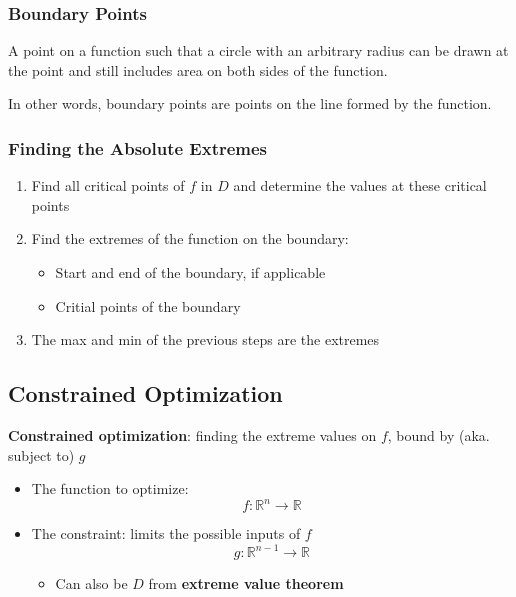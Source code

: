       \subsubsection{Boundary Points}

        A point on a function such that a circle with an arbitrary radius
        can be drawn at the point and still includes area on both sides of the
        function.

        In other words, boundary points are points on the line formed by the
        function.

      \subsubsection{Finding the Absolute Extremes}

        \begin{enumerate}
          \item Find all critical points of $ f $ in $ D $ and determine
          the values at these critical points
          \item Find the extremes of the function on the boundary:
          \begin{itemize}
            \item Start and end of the boundary, if applicable
            \item Critial points of the boundary
          \end{itemize}

          \item The max and min of the previous steps are the extremes
        \end{enumerate}

  \subsection{Constrained Optimization}

    \textbf{Constrained optimization}: finding the extreme values on $ f $,
    bound by (aka. subject to) $ g $

    \begin{itemize}
      \item The function to optimize:
      \begin{displaymath}
        f: \mathbb{R}^{n} \to \mathbb{R}
      \end{displaymath}

      \item The constraint: limits the possible inputs of $ f $
      \begin{displaymath}
        g: \mathbb{R}^{n - 1} \to \mathbb{R}
      \end{displaymath}
      \begin{itemize}
        \item Can also be $ D $ from \textbf{extreme value theorem}
      \end{itemize}
    \end{itemize}

